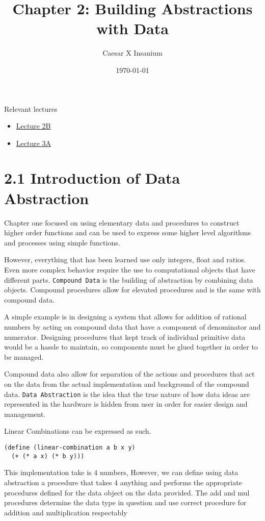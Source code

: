\documentclass[11pt]{article}
\author{Caesar X Insanium}
\date{\today}
\title{Chapter 2: Building Abstractions with Data}
\begin{document}
\maketitle
\tableofcontents

Relevant lectures
\begin{itemize}
\item \href{https://www.youtube.com/watch?v=DrFkf-T-6Co\&t=3722s}{Lecture 2B}
\item \href{https://www.youtube.com/watch?v=PEwZL3H2oKg\&list=PLE18841CABEA24090\&index=5}{Lecture 3A}
\end{itemize}

\section{2.1 Introduction of Data Abstraction}
\label{sec:org8d8c7b6}

Chapter one focused on using elementary data and procedures to construct
higher order functions and can be used to express some higher level
algorithms and processes using simple functions.

However, everything that has been learned use only integers, float and
ratios. Even more complex behavior require the use to computational
objects that have different parts. \texttt{Compound Data} is the building of
abstraction by combining data objects. Compound procedures allow for
elevated procedures and is the same with compound data.

A simple example is in designing a system that allows for addition of
rational numbers by acting on compound data that have a component of
denominator and numerator. Designing procedures that kept track of
individual primitive data would be a hassle to maintain, so components
must be glued together in order to be managed.

Compound data also allow for separation of the actions and procedures
that act on the data from the actual implementation and background of
the compound data. \texttt{Data Abstraction} is the idea that the true nature
of how data ideas are represented in the hardware is hidden from user in
order for easier design and management.

Linear Combinations can be expressed as such.

\begin{verbatim}
(define (linear-combination a b x y)
  (+ (* a x) (* b y)))
\end{verbatim}

This implementation take is 4 numbers, However, we can define using data
abstraction a procedure that takes 4 anything and performs the
appropriate procedures defined for the data object on the data provided.
The add and mul procedures determine the data type in question and use
correct procedure for addition and multiplication respectably
\end{document}
